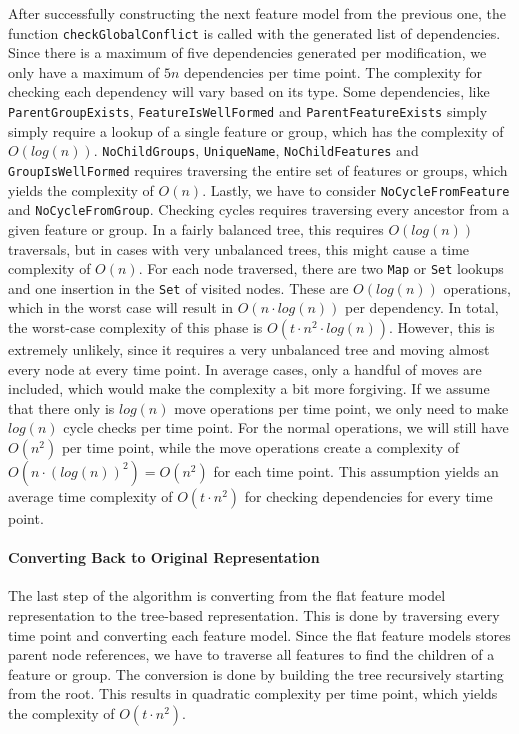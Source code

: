 \documentclass[a4paper,english]{ifimaster}
\begin{document}
After successfully constructing the next feature model from the previous one, the function \texttt{check\-Global\-Conflict} is called with the generated list of dependencies. Since there is a maximum of five dependencies generated per modification, we only have a maximum of $5n$ dependencies per time point. The complexity for checking each dependency will vary based on its type. Some dependencies, like \texttt{ParentGroupExists}, \texttt{FeatureIsWellFormed} and \texttt{ParentFeatureExists} simply simply require a lookup of a single feature or group, which has the complexity of $O(log(n))$. \texttt{NoChildGroups}, \texttt{UniqueName}, \texttt{NoChildFeatures} and \texttt{GroupIsWellFormed} requires traversing the entire set of features or groups, which yields the complexity of $O(n)$. Lastly, we have to consider \texttt{NoCycleFromFeature} and \texttt{NoCycleFromGroup}. Checking cycles requires traversing every ancestor from a given feature or group. In a fairly balanced tree, this requires $O(log(n))$ traversals, but in cases with very unbalanced trees, this might cause a time complexity of $O(n)$. For each node traversed, there are two \texttt{Map} or \texttt{Set} lookups and one insertion in the \texttt{Set} of visited nodes. These are $O(log(n))$ operations, which in the worst case will result in $O(n \cdot log(n))$ per dependency. In total, the worst-case complexity of this phase is $O(t \cdot n^2  \cdot log(n))$. However, this is extremely unlikely, since it requires a very unbalanced tree and moving almost every node at every time point. In average cases, only a handful of moves are included, which would make the complexity a bit more forgiving. If we assume that there only is $log(n)$ move operations per time point, we only need to make $log(n)$ cycle checks per time point. For the normal operations, we will still have $O(n^2)$ per time point, while the move operations create a complexity of $O(n \cdot (log(n))^2) = O(n^2)$ for each time point. This assumption yields an average time complexity of $O(t \cdot n^2)$ for checking dependencies for every time point.

\paragraph{Converting Back to Original Representation}

The last step of the algorithm is converting from the flat feature model representation to the tree-based representation. This is done by traversing every time point and converting each feature model. Since the flat feature models stores parent node references, we have to traverse all features to find the children of a feature or group. The conversion is done by building the tree recursively starting from the root. This results in quadratic complexity per time point, which yields the complexity of $O(t \cdot n^2)$.
\end{document}
